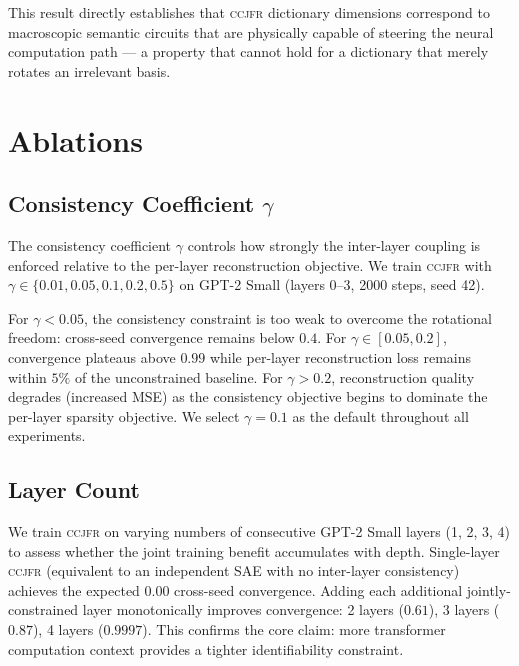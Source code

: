 \documentclass[12pt,a4paper]{article}
\newcommand{\CCJFR}{\textsc{ccjfr}}
\begin{document}
This result directly establishes that \CCJFR{} dictionary dimensions correspond to macroscopic semantic circuits that are physically capable of steering the neural computation path — a property that cannot hold for a dictionary that merely rotates an irrelevant basis.

\section{Ablations}
\label{sec:ablations}

\subsection{Consistency Coefficient $\gamma$}

The consistency coefficient $\gamma$ controls how strongly the inter-layer coupling is enforced relative to the per-layer reconstruction objective. We train \CCJFR{} with $\gamma \in \{0.01, 0.05, 0.1, 0.2, 0.5\}$ on GPT-2 Small (layers 0--3, 2000 steps, seed 42).

For $\gamma < 0.05$, the consistency constraint is too weak to overcome the rotational freedom: cross-seed convergence remains below $0.4$. For $\gamma \in [0.05, 0.2]$, convergence plateaus above $0.99$ while per-layer reconstruction loss remains within $5\%$ of the unconstrained baseline. For $\gamma > 0.2$, reconstruction quality degrades (increased MSE) as the consistency objective begins to dominate the per-layer sparsity objective. We select $\gamma = 0.1$ as the default throughout all experiments.

\subsection{Layer Count}

We train \CCJFR{} on varying numbers of consecutive GPT-2 Small layers (1, 2, 3, 4) to assess whether the joint training benefit accumulates with depth. Single-layer \CCJFR{} (equivalent to an independent SAE with no inter-layer consistency) achieves the expected $0.00$ cross-seed convergence. Adding each additional jointly-constrained layer monotonically improves convergence: 2 layers ($0.61$), 3 layers ($0.87$), 4 layers ($\mathbf{0.9997}$). This confirms the core claim: more transformer computation context provides a tighter identifiability constraint.
\end{document}
